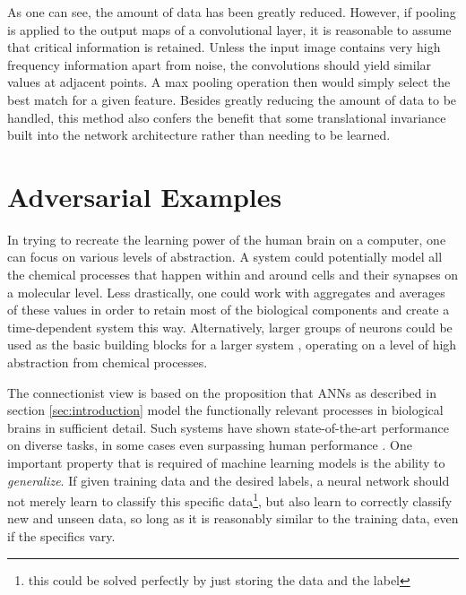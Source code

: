 \documentclass[11pt, a4paper]{article}
\begin{document}
As one can see, the amount of data has been greatly reduced. However, if pooling is applied to the output maps of a convolutional layer, it is reasonable to assume that critical information is retained. Unless the input image contains very high frequency information apart from noise, the convolutions should yield similar values at adjacent points. A max pooling operation then would simply select the best match for a given feature. Besides greatly reducing the amount of data to be handled, this method also confers the benefit that some translational invariance built into the network architecture rather than needing to be learned.











\section{Adversarial Examples}
\label{sec:adversarial-examples}

In trying to recreate the learning power of the human brain on a computer, one can focus on various levels of abstraction. A system could potentially model all the chemical processes that happen within and around cells and their synapses on a molecular level. Less drastically, one could work with aggregates and averages of these values in order to retain most of the biological components and create a time-dependent system this way. Alternatively, larger groups of neurons could be used as the basic building blocks for a larger system \cite{dynamic-field-theory-movement-preparation}, operating on a level of high abstraction from chemical processes.

The connectionist view is based on the proposition that ANNs as described in section \ref{sec:introduction} model the functionally relevant processes in biological brains in sufficient detail. Such systems have shown state-of-the-art performance on diverse tasks, in some cases even surpassing human performance \cite{multi-column-deep-networks-image-classification}. One important property that is required of machine learning models is the ability to \emph{generalize}. If given training data and the desired labels, a neural network should not merely learn to classify this specific data\footnote{this could be solved perfectly by just storing the data and the label}, but also learn to correctly classify new and unseen data, so long as it is reasonably similar to the training data, even if the specifics vary.
\end{document}
